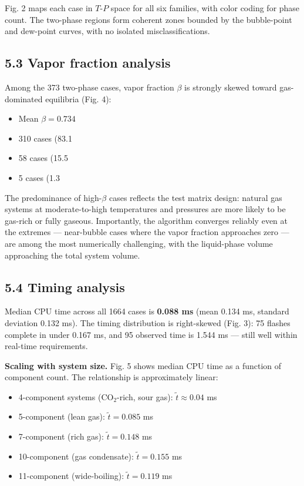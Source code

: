\documentclass[review,3p]{custom}
\begin{document}
{Fig. 2 maps each case in $T$-$P$ space for all six families, with color coding for
phase count. The two-phase regions form coherent zones bounded by the bubble-point
and dew-point curves, with no isolated misclassifications.

\subsection{5.3 Vapor fraction analysis}

Among the 373 two-phase cases, vapor fraction $\beta$ is strongly skewed toward
gas-dominated equilibria (Fig. 4):

\begin{itemize}
  \item Mean $\beta = 0.734$
  \item 310 cases (83.1%
  \item 58 cases (15.5%
  \item 5 cases (1.3%
\end{itemize}

The predominance of high-$\beta$ cases reflects the test matrix design: natural gas
systems at moderate-to-high temperatures and pressures are more likely to be
gas-rich or fully gaseous. Importantly, the algorithm converges reliably even at
the extremes — near-bubble cases where the vapor fraction approaches zero — are
among the most numerically challenging, with the liquid-phase volume approaching
the total system volume.

\subsection{5.4 Timing analysis}

Median CPU time across all 1664 cases is \textbf{0.088 ms} (mean 0.134 ms, standard
deviation 0.132 ms). The timing distribution is right-skewed (Fig. 3): 75%
flashes complete in under 0.167 ms, and 95%
observed time is 1.544 ms — still well within real-time requirements.

\textbf{Scaling with system size.} Fig. 5 shows median CPU time as a function of
component count. The relationship is approximately linear:

\begin{itemize}
  \item 4-component systems (CO$_2$-rich, sour gas): $\tilde{t} \approx 0.04$ ms
  \item 5-component (lean gas): $\tilde{t} = 0.085$ ms
  \item 7-component (rich gas): $\tilde{t} = 0.148$ ms
  \item 10-component (gas condensate): $\tilde{t} = 0.155$ ms
  \item 11-component (wide-boiling): $\tilde{t} = 0.119$ ms
\end{itemize}

}
\end{document}
